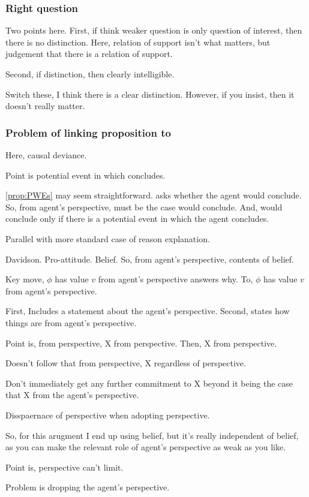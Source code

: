 \subsubsection{Right question}
\label{sec:right-question}

\begin{note}
  Two points here.
  First, if think weaker question is only question of interest, then there is no distinction.
  Here, relation of support isn't what matters, but judgement that there is a relation of support.

  Second, if distinction, then clearly intelligible.

  Switch these, I think there is a clear distinction.
  However, if you insist, then it doesn't really matter.
\end{note}

\subsubsection{Problem of linking proposition to \qWhy{}}
\label{sec:probl-link-prop}

\begin{note}
  Here, causal deviance.
\end{note}

\newpage

\begin{note}
  Point is potential event in which concludes.

  \autoref{prop:PWEs} may seem straightforward.
  \qzS{} asks whether the agent would conclude.
  So, from agent's perspective, must be the case would conclude.
  And, would conclude only if there is a potential event in which the agent concludes.

  Parallel with more standard case of reason explanation.

  Davidson.
  Pro-attitude.
  Belief.
  So, from agent's perspective, contents of belief.
\end{note}

\begin{note}
  Key move, \(\phi\) has value \(v\) from agent's perspective answers why.
  To, \(\phi\) has value \(v\) from agent's perspective.

  First, Includes a statement about the agent's perspective.
  Second, states how things are from agent's perspective.

  Point is, from perspective, X from perspective.
  Then, X from perspective.

  Doesn't follow that from perspective, X regardless of perspective.

  Don't immediately get any further commitment to X beyond it being the case that X from the agent's perspective.

  Disspaernace of perspective when adopting perspective.

  So, for this arugment I end up using belief, but it's really independent of belief, as you can make the relevant role of agent's perspective as weak as you like.

  Point is, perspective can't limit.

  Problem is dropping the agent's perspective.
\end{note}

